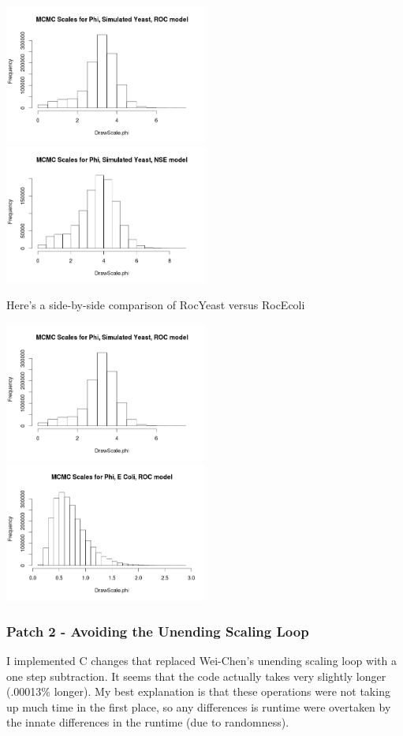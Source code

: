 \includegraphics[width=0.5\textwidth]{data/oct17-RocYeastScales.png}
\includegraphics[width=0.5\textwidth]{data/oct17-NseYeastScales.png}

Here's a side-by-side comparison of RocYeast versus RocEcoli


\includegraphics[width=0.5\textwidth]{data/oct17-RocYeastScales.png}
\includegraphics[width=0.5\textwidth]{data/oct20-RocEcoliScales.png}

\subsubsection{Patch 2 - Avoiding the Unending Scaling Loop}

I implemented C changes that replaced Wei-Chen's unending scaling loop with a one step subtraction. It seems that the code actually takes very slightly longer (.00013\% longer). My best explanation is that these operations were not taking up much time in the first place, so any differences is runtime were overtaken by the innate differences in the runtime (due to randomness).

